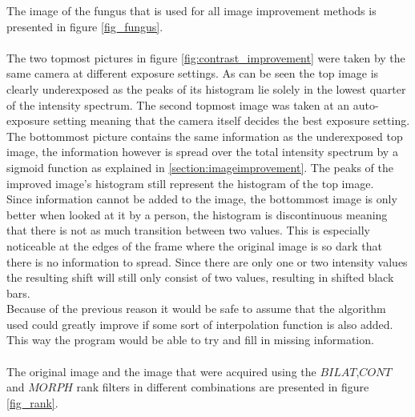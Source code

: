 The image of the fungus that is used for all image improvement methods is presented in figure \ref{fig_fungus}.\\
\\
The two topmost pictures in figure \ref{fig:contrast_improvement} were taken by the same camera at different exposure settings. As can be seen the top image is clearly underexposed as the peaks of its histogram lie solely in the lowest quarter of the intensity spectrum. The second topmost image was taken at an auto-exposure setting meaning that the camera itself decides the best exposure setting. The bottommost picture contains the same information as the underexposed top image, the information however is spread over the total intensity spectrum by a sigmoid function as explained in \ref{section:imageimprovement}. The peaks of the improved image's histogram still represent the histogram of the top image.\\
Since information cannot be added to the image, the bottommost image is only better when looked at it by a person, the histogram is discontinuous meaning that there is not as much transition between two values. This is especially noticeable at the edges of the frame where the original image is so dark that there is no information to spread. Since there are only one or two intensity values the resulting shift will still only consist of two values, resulting in shifted black bars.\\
Because of the previous reason it would be safe to assume that the algorithm used could greatly improve if some sort of interpolation function is also added. This way the program would be able to try and fill in missing information.\\
\\

The original image and the image that were acquired using the $BILAT$,$CONT$ and $MORPH$ rank filters in different combinations are presented in figure \ref{fig_rank}.

